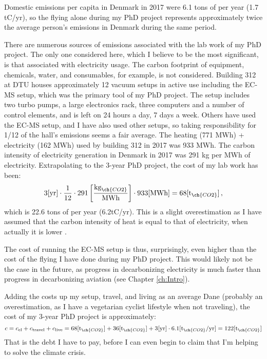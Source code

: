 Domestic  emissions per capita in Denmark in 2017 were 6.1 tons of  per year\cite{Ritchie2019a} (1.7 tC/yr), so the flying alone during my PhD project represents approximately twice the average person's  emissions in Denmark during the same period. 

There are numerous sources of  emissions associated with the lab work of my PhD project. The only one considered here, which I believe to be the most significant, is that associated with electricity usage. The carbon footprint of equipment, chemicals, water, and consumables, for example, is not considered. Building 312 at DTU houses approximately 12 vacuum setups in active use including the EC-MS setup, which was the primary tool of my PhD project. The setup includes two turbo pumps, a large electronics rack, three computers and a number of control elements, and is left on 24 hours a day, 7 days a week. Others have used the EC-MS setup, and I have also used other setups, so taking responsibility for 1/12 of the hall's  emissions seems a fair average. The heating (771 MWh) + electricity (162 MWh) used by building 312 in 2017 was 933 MWh. The carbon intensity of electricity generation in Denmark in 2017 was 291 kg  per MWh of electricity\cite{DanishEnergyAgency}. Extrapolating to the 3-year PhD project, the  cost of my lab work has been:
\begin{equation}
3 \text{[yr]} \cdot \frac{1}{12} \cdot 291 \left[\frac{\text{kg}_{\ch{CO2}}}{\text{MWh}}\right] \cdot 933\text{[MWh]} = 68 [\text{t}_{\ch{CO2}}]\,,
\end{equation}
which is 22.6 tons of  per year (6.2tC/yr). This is a slight overestimation as I have assumed that the carbon intensity of heat is equal to that of electricity, when actually it is lower \cite{EnergiNet}. 

The  cost of running the EC-MS setup is thus, surprisingly, even higher than the  cost of the flying I have done during my PhD project. This would likely not be the case in the future, as progress in decarbonizing electricity is much faster than progress in decarbonizing aviation (see Chapter \ref{ch:Intro}). 

Adding the costs up my setup, travel, and living as an average Dane (probably an overestimation, as I have a vegetarian cyclist lifestyle when not traveling), the  cost of my 3-year PhD project is approximately:
\begin{equation}
c = c_\text{el} + c_\text{travel} + c_\text{live} = 68 [\text{t}_{\ch{CO2}}] + 36 [\text{t}_{\ch{CO2}}] + 3 \text{[yr]} \cdot 6.1  [\text{t}_{\ch{CO2}}/\text{yr}] = 122 [\text{t}_{\ch{CO2}}]\label{eq:costs}
\end{equation}
That is the debt I have to pay, before I can even begin to claim that I'm helping to solve the climate crisis.


